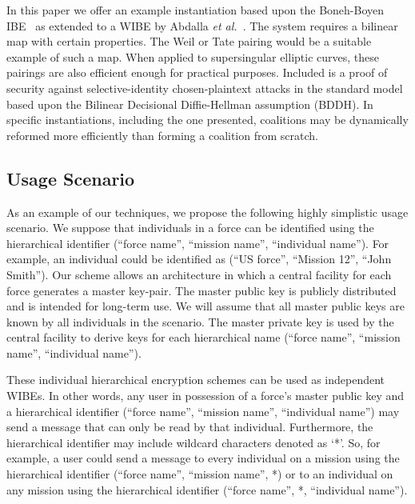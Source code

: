 \documentclass[10pt]{llncs}
\begin{document}

In this paper we offer an example instantiation based upon the
Boneh-Boyen IBE~\cite{Boneh04} as extended to a WIBE by Abdalla
\emph{et al.}~\cite{Abdalla06}.  The system requires a bilinear map with certain
properties. The Weil or Tate pairing would be a suitable example of
such a map. When applied to supersingular elliptic curves, these
pairings are also efficient enough for practical purposes. Included
is a proof of security against selective-identity chosen-plaintext
attacks in the standard model based upon the Bilinear Decisional
Diffie-Hellman assumption (BDDH). In specific instantiations,
including the one presented, coalitions may be dynamically reformed
more efficiently than forming a coalition from scratch.

\subsection{Usage Scenario}

As an example of our techniques, we propose the following highly simplistic usage scenario. We suppose that individuals in a force can be identified using the hierarchical identifier (``force name'', ``mission name'', ``individual name''). For example, an individual could be identified as (``US force'', ``Mission 12'', ``John Smith''). Our scheme allows an architecture in which a central facility for each force generates a master key-pair. The master public key is publicly distributed and is intended for long-term use. We will assume that all master public keys are known by all individuals in the scenario. The master private key is used by the central facility to derive keys for each hierarchical name (``force name'', ``mission name'', ``individual name'').

These individual hierarchical encryption schemes can be used as independent WIBEs. In other words, any user in possession of a force's master public key and a hierarchical identifier (``force name'', ``mission name'', ``individual name'') may send a message that can only be read by that individual. Furthermore, the hierarchical identifier may include wildcard characters denoted as `*'. So, for example, a user could send a message to every individual on a mission using the hierarchical identifier (``force name'', ``mission name'', *) or to an individual on any mission using the hierarchical identifier (``force name'', *, ``individual name'').
\end{document}
